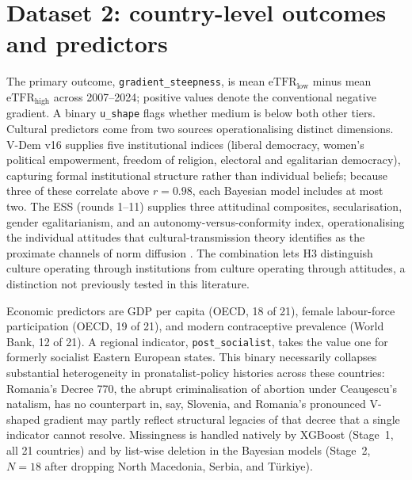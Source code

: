 \documentclass[12pt,a4paper]{report}
\begin{document}
\section{Dataset 2: country-level outcomes and predictors}
The primary outcome, \texttt{gradient\_steepness}, is mean $\mathrm{eTFR}_{\text{low}}$ minus mean
$\mathrm{eTFR}_{\text{high}}$ across 2007--2024; positive values denote the conventional negative
gradient. A binary \texttt{u\_shape} flags whether medium is below both other tiers. Cultural
predictors come from two sources operationalising distinct dimensions. V-Dem v16 supplies five
institutional indices (liberal democracy, women's political empowerment, freedom of religion,
electoral and egalitarian democracy), capturing formal institutional structure rather than
individual beliefs; because three of these correlate above $r=0.98$, each Bayesian model includes
at most two. The ESS (rounds 1--11) supplies three attitudinal composites, secularisation,
gender egalitarianism, and an autonomy-versus-conformity index, operationalising the individual
attitudes that cultural-transmission theory identifies as the proximate channels of norm diffusion
\citep{bongaartswatkins1996,colleran2016}. The combination lets H3 distinguish culture operating
through institutions from culture operating through attitudes, a distinction not previously tested
in this literature.

Economic predictors are GDP per capita (OECD, 18 of 21), female labour-force participation (OECD,
19 of 21), and modern contraceptive prevalence (World Bank, 12 of 21). A regional indicator,
\texttt{post\_socialist}, takes the value one for formerly socialist Eastern European states. This
binary necessarily collapses substantial heterogeneity in pronatalist-policy histories across these
countries: Romania's Decree 770, the abrupt criminalisation of abortion under Ceau\c{s}escu's
natalism, has no counterpart in, say, Slovenia, and Romania's pronounced V-shaped gradient may
partly reflect structural legacies of that decree that a single indicator cannot resolve.
Missingness is handled natively by XGBoost (Stage~1, all 21 countries) and by list-wise deletion
in the Bayesian models (Stage~2, $N=18$ after dropping North Macedonia, Serbia, and T\"urkiye).
\end{document}
